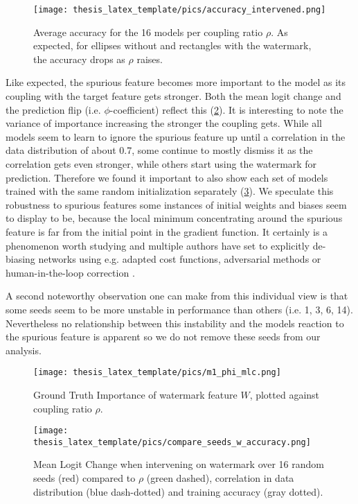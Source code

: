 \begin{figure}[t!]
    \centering
    \texttt{[image: thesis\_latex\_template/pics/accuracy\_intervened.png]}
    \caption[Accuracy for intervened Subsets]{Average accuracy for the 16 models per coupling ratio $\rho$. As expected, for ellipses without and rectangles with the watermark, the accuracy drops as $\rho$ raises.}
    \label{fig:accuracy_intervened}
\end{figure}

Like expected, the spurious feature becomes more important to the model as its coupling with the target feature gets stronger. Both the mean logit change and the prediction flip (i.e. $\phi$-coefficient) reflect this (\cref{fig:m1_results}). It is interesting to note the variance of importance increasing the stronger the coupling gets. While all models seem to learn to ignore the spurious feature up until a correlation in the data distribution of about 0.7, some continue to mostly dismiss it as the correlation gets even stronger, while others start using the watermark for prediction. Therefore we found it important to also show each set of models trained with the same random initialization separately (\cref{fig:gt_over_seeds}). We speculate this robustness to spurious features some instances of initial weights and biases seem to display to be, because the local minimum concentrating around the spurious feature is far from the initial point in the gradient function. It certainly is a phenomenon worth studying and multiple authors have set to explicitly de-biasing networks using e.g. adapted cost functions, adversarial methods or human-in-the-loop correction \cite{Anders2022,Pahde2023,Reimers2021, Reimers2021b, Dreyer2023a}.

A second noteworthy observation one can make from this individual view is that some seeds seem to be more unstable in performance than others (i.e. 1, 3, 6, 14). Nevertheless no relationship between this instability and the models reaction to the spurious feature is apparent so we do not remove these seeds from our analysis.

\begin{figure}[t!]
    \centering
    \texttt{[image: thesis\_latex\_template/pics/m1\_phi\_mlc.png]}
    \caption[Ground Truth Importance $m_1$]{Ground Truth Importance of watermark feature $W$, plotted against coupling ratio $\rho$.}
    \label{fig:m1_results}
\end{figure}

\begin{figure}[t!]
    \centering
    \texttt{[image: thesis\_latex\_template/pics/compare\_seeds\_w\_accuracy.png]}
    \caption[Comparing Seeds]{Mean Logit Change when intervening on watermark over 16 random seeds (red)
    compared to $\rho$ (green dashed), correlation in data distribution (blue dash-dotted) and training accuracy (gray dotted).
    }
    \label{fig:gt_over_seeds}
\end{figure}



